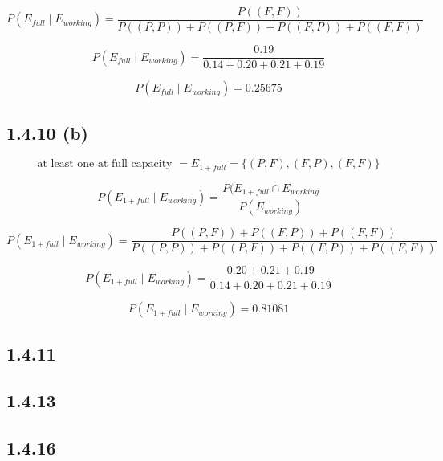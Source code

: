 \documentclass{article}
\begin{document}
\[
P\left(E_{full}\mid E_{working}\right) =
\frac
    {P((F, F))}
    {P((P, P)) + P((P, F)) + P((F, P)) + P((F, F))}
\]

\[
P\left(E_{full}\mid E_{working}\right) =
\frac
    {0.19}
    {0.14 + 0.20 + 0.21 + 0.19}
\]

\[
\boxed{P\left(E_{full}\mid E_{working}\right) = 0.25675}
\]

\subsection*{1.4.10 (b)}

\[
\text{at least one at full capacity } = E_{1+ full} = \{(P, F), (F, P), (F, F)\}
\]

\[
P\left(E_{1+ full}\mid E_{working}\right) =
\frac
    {P(E_{1+ full}\cap E_{working}}
    {P(E_{working})}
\]

\[
P\left(E_{1+ full}\mid E_{working}\right) =
\frac
    {P((P, F)) + P((F, P)) + P((F, F))}
    {P((P, P)) + P((P, F)) + P((F, P)) + P((F, F))}
\]

\[
P\left(E_{1+ full}\mid E_{working}\right) =
\frac
    {0.20 + 0.21 + 0.19}
    {0.14 + 0.20 + 0.21 + 0.19}
\]

\[
\boxed{P\left(E_{1+ full}\mid E_{working}\right) = 0.81081}
\]

\subsection*{1.4.11}



\subsection*{1.4.13}



\subsection*{1.4.16}
\end{document}
